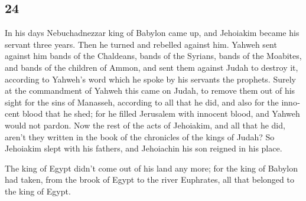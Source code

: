 \begin{paracol}{2}
\switchcolumn
\begin{otherlanguage}{english}

\hypertarget{section-47}{%
\section{24}\label{section-47}}

 In his days Nebuchadnezzar king of Babylon came up, and
Jehoiakim became his servant three years. Then he turned and rebelled
against him.  Yahweh sent against him bands of the
Chaldeans, bands of the Syrians, bands of the Moabites, and bands of the
children of Ammon, and sent them against Judah to destroy it, according
to Yahweh's word which he spoke by his servants the prophets.
 Surely at the commandment of Yahweh this came on Judah,
to remove them out of his sight for the sins of Manasseh, according to
all that he did,  and also for the innocent blood that he
shed; for he filled Jerusalem with innocent blood, and Yahweh would not
pardon.  Now the rest of the acts of Jehoiakim, and all
that he did, aren't they written in the book of the chronicles of the
kings of Judah?  So Jehoiakim slept with his fathers, and
Jehoiachin his son reigned in his place.

 The king of Egypt didn't come out of his land any more;
for the king of Babylon had taken, from the brook of Egypt to the river
Euphrates, all that belonged to the king of Egypt.


\end{otherlanguage}
\end{paracol}
